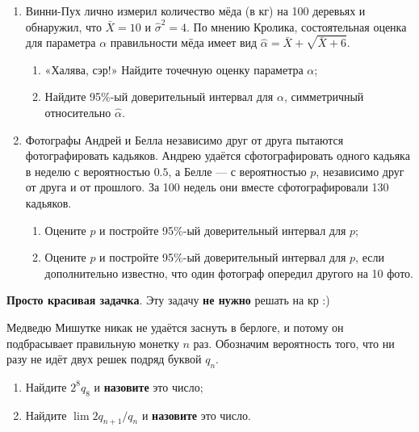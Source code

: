 \documentclass[11pt]{article} %
\begin{document}
\begin{enumerate}
  \item Винни-Пух лично измерил количество мёда (в кг) на 100 деревьях и обнаружил, что $\bar X = 10$ и $\hat\sigma^2 = 4$. 
    По мнению Кролика, состоятельная оценка для параметра $\alpha$ правильности мёда имеет вид $\hat \alpha = \bar X + \sqrt{\bar X + 6}$. 

    \begin{enumerate}
      \item «Халява, сэр!» Найдите точечную оценку параметра $\alpha$;
      \item Найдите 95\%-ый доверительный интервал для $\alpha$, симметричный относительно $\hat\alpha$.
    \end{enumerate}

  \item Фотографы Андрей и Белла независимо друг от друга пытаются фотографировать кадьяков. 
    Андрею удаётся сфотографировать одного кадьяка в неделю с вероятностью $0.5$, а Белле — с вероятностью $p$, 
    независимо друг от друга и от прошлого.
    За 100 недель они вместе сфотографировали 130 кадьяков.

    \begin{enumerate}
      \item Оцените $p$ и постройте 95\%-ый доверительный интервал для $p$;
      \item Оцените $p$ и постройте 95\%-ый доверительный интервал для $p$, если дополнительно известно, что один фотограф опередил другого на 10 фото.
    \end{enumerate}

\end{enumerate}
 

\textbf{Просто красивая задачка}. Эту задачу \textbf{не нужно} решать на кр :) 

Медведю Мишутке никак не удаётся заснуть в берлоге, и потому он подбрасывает правильную монетку $n$ раз. 
Обозначим вероятность того, что ни разу не идёт двух решек подряд буквой $q_n$. 
   

        \begin{enumerate}[label=\asbuk*)]
	  \item Найдите $2^8q_8$ и \textbf{назовите} это число;
          \item Найдите $\lim 2q_{n+1}/q_n$ и \textbf{назовите} это число.
	\end{enumerate}
\end{document}

